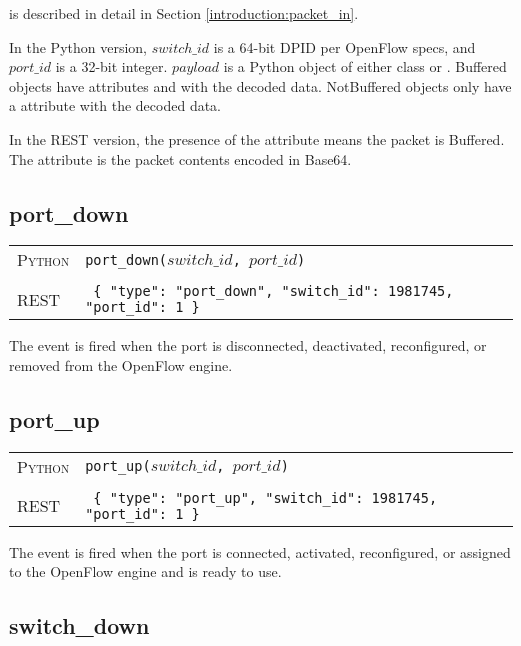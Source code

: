  is described in detail in Section \ref{introduction:packet_in}.  

In the Python version, $switch\_id$ is a 64-bit DPID per OpenFlow specs,  and $port\_id$ is a 32-bit 
integer.  $payload$ is a Python object of either class  or .  
Buffered objects have attributes  and with the decoded data. 
NotBuffered objects only have a  attribute with the decoded data.    

In the REST version,
the presence of the  attribute means the packet is Buffered.  The  attribute
is the packet contents encoded in Base64.  

\subsection{port\_down}

\bigskip
\begin{tabularx}{\linewidth}{lX}
\textsc{Python}   & \texttt{port\_down($switch\_id$, $port\_id$)} \\ \\
\textsc{REST} & \texttt{ \{ "type": "port\_down", "switch\_id": 1981745, "port\_id": 1 \} } 
\end{tabularx}

The  event is fired when the port is disconnected, deactivated, reconfigured, or
removed from the OpenFlow engine.  
 
\subsection{port\_up}

\bigskip
\begin{tabularx}{\linewidth}{lX}
\textsc{Python}   & \texttt{port\_up($switch\_id$, $port\_id$)} \\ \\
\textsc{REST} & \texttt{ \{ "type": "port\_up", "switch\_id": 1981745, "port\_id": 1 \} } 
\end{tabularx}

The  event is fired when the port is connected, activated, reconfigured, or
assigned to the OpenFlow engine and is ready to use.  

\subsection{switch\_down}

